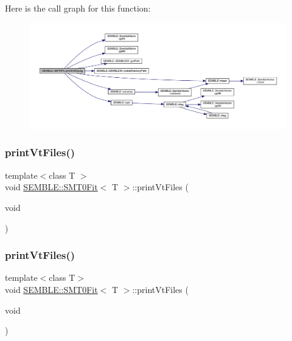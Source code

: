 Here is the call graph for this function\+:
\nopagebreak
\begin{figure}[H]
\begin{center}
\leavevmode
\includegraphics[width=350pt]{d6/dad/structSEMBLE_1_1SMT0Fit_a054737215697a880fe9feedacb6ffb61_cgraph}
\end{center}
\end{figure}
\mbox{\label{structSEMBLE_1_1SMT0Fit_a20e4a3b9231871541c881902ff0da2a3}} 
\subsubsection{\texorpdfstring{printVtFiles()}{printVtFiles()}\hspace{0.1cm}{\footnotesize\ttfamily [1/2]}}
{\footnotesize\ttfamily template$<$class T $>$ \\
void \mbox{\hyperlink{structSEMBLE_1_1SMT0Fit}{S\+E\+M\+B\+L\+E\+::\+S\+M\+T0\+Fit}}$<$ T $>$\+::print\+Vt\+Files (\begin{DoxyParamCaption}\item[{void}]{ }\end{DoxyParamCaption})}

\mbox{\label{structSEMBLE_1_1SMT0Fit_a20e4a3b9231871541c881902ff0da2a3}} 
\subsubsection{\texorpdfstring{printVtFiles()}{printVtFiles()}\hspace{0.1cm}{\footnotesize\ttfamily [2/2]}}
{\footnotesize\ttfamily template$<$class T$>$ \\
void \mbox{\hyperlink{structSEMBLE_1_1SMT0Fit}{S\+E\+M\+B\+L\+E\+::\+S\+M\+T0\+Fit}}$<$ T $>$\+::print\+Vt\+Files (\begin{DoxyParamCaption}\item[{void}]{ }\end{DoxyParamCaption})}

